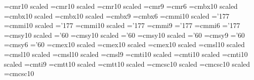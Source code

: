%
%
%
%
%
\font\seventeenrm =cmr10 scaled
\font\fourteenrm  =cmr10 scaled
\font\twelverm    =cmr10 scaled
\font\ninerm      =cmr9
\font\sixrm       =cmr6
%
\font\seventeenbf =cmbx10 scaled
\font\fourteenbf  =cmbx10 scaled
\font\twelvebf    =cmbx10 scaled
\font\ninebf      =cmbx9
\font\sixbf       =cmbx6
%
\font\seventeeni  =cmmi10 scaled    \skewchar\seventeeni='177
\font\fourteeni   =cmmi10 scaled     \skewchar\fourteeni='177
\font\twelvei     =cmmi10 scaled       \skewchar\twelvei='177
\font\ninei       =cmmi9                          \skewchar\ninei='177
\font\sixi        =cmmi6                           \skewchar\sixi='177
%
\font\seventeensy =cmsy10 scaled    \skewchar\seventeensy='60
\font\fourteensy  =cmsy10 scaled     \skewchar\fourteensy='60
\font\twelvesy    =cmsy10 scaled       \skewchar\twelvesy='60
\font\ninesy      =cmsy9                          \skewchar\ninesy='60
\font\sixsy       =cmsy6                           \skewchar\sixsy='60
%
\font\seventeenex =cmex10 scaled
\font\fourteenex  =cmex10 scaled
\font\twelveex    =cmex10 scaled
%
\font\seventeensl =cmsl10 scaled
\font\fourteensl  =cmsl10 scaled
\font\twelvesl    =cmsl10 scaled
\font\ninesl      =cmsl9
%
\font\seventeenit =cmti10 scaled
\font\fourteenit  =cmti10 scaled
\font\twelveit    =cmti10 scaled
\font\nineit      =cmti9
%
\font\fourteentt  =cmtt10 scaled
\font\twelvett    =cmtt10 scaled
%
\font\fourteencp  =cmcsc10 scaled
\font\twelvecp    =cmcsc10 scaled
\font\tencp       =cmcsc10
%
%
\def\fourteenf@nts{\relax
    \textfont0=\fourteenrm          \scriptfont0=\tenrm
      \scriptscriptfont0=\sevenrm
    \textfont1=\fourteeni           \scriptfont1=\teni
      \scriptscriptfont1=\seveni
    \textfont2=\fourteensy          \scriptfont2=\tensy
      \scriptscriptfont2=\sevensy
    \textfont3=\fourteenex          \scriptfont3=\twelveex
      \scriptscriptfont3=\tenex
    \textfont\itfam=\fourteenit     \scriptfont\itfam=\tenit
    \textfont\slfam=\fourteensl     \scriptfont\slfam=\tensl
    \textfont\bffam=\fourteenbf     \scriptfont\bffam=\tenbf
      \scriptscriptfont\bffam=\sevenbf
    \textfont\ttfam=\fourteentt
    \textfont\cpfam=\fourteencp }
